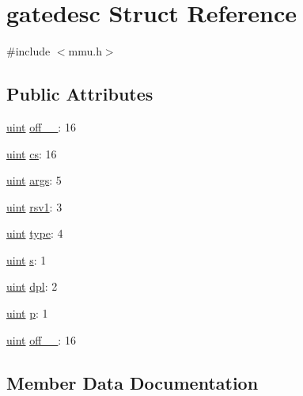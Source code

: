 \hypertarget{structgatedesc}{}\section{gatedesc Struct Reference}
\label{structgatedesc}


{\ttfamily \#include $<$mmu.\+h$>$}

\subsection*{Public Attributes}
\begin{DoxyCompactItemize}
\item 
\hyperlink{types_8h_a91ad9478d81a7aaf2593e8d9c3d06a14}{uint} \hyperlink{structgatedesc_a4f7268ba32b6a8b3963aa6d23e51af59}{off\+\_\+\_}\+: 16
\item 
\hyperlink{types_8h_a91ad9478d81a7aaf2593e8d9c3d06a14}{uint} \hyperlink{structgatedesc_a53e768c461dce9cc97048e7d19351af1}{cs}\+: 16
\item 
\hyperlink{types_8h_a91ad9478d81a7aaf2593e8d9c3d06a14}{uint} \hyperlink{structgatedesc_a9b41bea284fe0922c440f4c253e926ff}{args}\+: 5
\item 
\hyperlink{types_8h_a91ad9478d81a7aaf2593e8d9c3d06a14}{uint} \hyperlink{structgatedesc_ad11779f5ce40e53a8feb3dfdaf3f0ee5}{rsv1}\+: 3
\item 
\hyperlink{types_8h_a91ad9478d81a7aaf2593e8d9c3d06a14}{uint} \hyperlink{structgatedesc_a41d6e5fb9bb27699bdb7d729c67ff32c}{type}\+: 4
\item 
\hyperlink{types_8h_a91ad9478d81a7aaf2593e8d9c3d06a14}{uint} \hyperlink{structgatedesc_a54d731df342be3a775cc847a3dab1a53}{s}\+: 1
\item 
\hyperlink{types_8h_a91ad9478d81a7aaf2593e8d9c3d06a14}{uint} \hyperlink{structgatedesc_a4c62f5618440769c78ed976cae23c13d}{dpl}\+: 2
\item 
\hyperlink{types_8h_a91ad9478d81a7aaf2593e8d9c3d06a14}{uint} \hyperlink{structgatedesc_a5f754b650dc96be286cbc74e69da6a81}{p}\+: 1
\item 
\hyperlink{types_8h_a91ad9478d81a7aaf2593e8d9c3d06a14}{uint} \hyperlink{structgatedesc_af388a77c8f2a8a8c0bd1ca74a7dbaef7}{off\+\_\+\_}\+: 16
\end{DoxyCompactItemize}


\subsection{Member Data Documentation}
